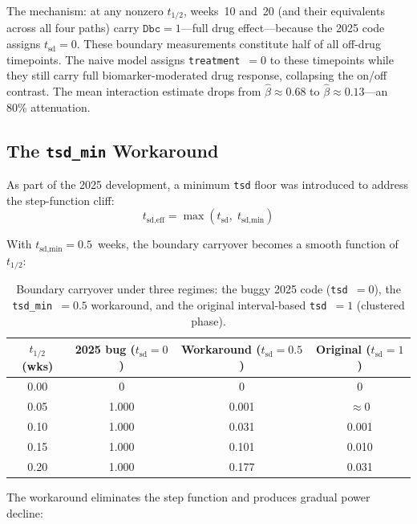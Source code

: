 \documentclass[11pt]{article}
\begin{document}
The mechanism: at any nonzero $t_{1/2}$, weeks~10 and~20 (and their
equivalents across all four paths) carry $\texttt{Dbc} = 1$---full
drug effect---because the 2025 code assigns $t_{\text{sd}} = 0$. These
boundary measurements constitute half of all off-drug timepoints.
The naive model assigns \texttt{treatment}~$= 0$ to these timepoints
while they still carry full biomarker-moderated drug response,
collapsing the on/off contrast. The mean interaction estimate drops
from $\hat{\beta} \approx 0.68$ to $\hat{\beta} \approx 0.13$---an
80\% attenuation.

\subsection{The \texttt{tsd\_min} Workaround}

As part of the 2025 development, a minimum \texttt{tsd} floor was
introduced to address the step-function cliff:
\[
  t_{\text{sd,eff}} = \max(t_{\text{sd}}, \; t_{\text{sd,min}})
\]

With $t_{\text{sd,min}} = 0.5$~weeks, the boundary carryover becomes
a smooth function of $t_{1/2}$:

\begin{table}[h]
\centering
\caption{Boundary carryover under three regimes: the buggy 2025
  code (\texttt{tsd}~$= 0$), the \texttt{tsd\_min}~$= 0.5$
  workaround, and the original interval-based \texttt{tsd}~$= 1$
  (clustered phase).}
\label{tab:boundary_three}
\begin{tabular}{@{}cccc@{}}
\toprule
$t_{1/2}$ (wks)
  & 2025 bug ($t_{\text{sd}} = 0$)
  & Workaround ($t_{\text{sd}} = 0.5$)
  & Original ($t_{\text{sd}} = 1$) \\
\midrule
0.00 & 0 & 0 & 0 \\
0.05 & 1.000 & 0.001 & $\approx$0 \\
0.10 & 1.000 & 0.031 & 0.001 \\
0.15 & 1.000 & 0.101 & 0.010 \\
0.20 & 1.000 & 0.177 & 0.031 \\
\bottomrule
\end{tabular}
\end{table}

The workaround eliminates the step function and produces gradual
power decline:
\end{document}
